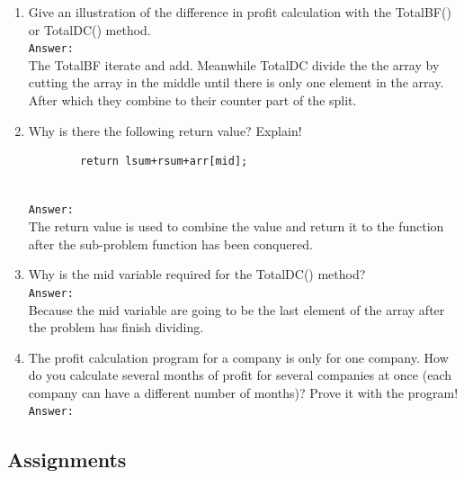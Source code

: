\documentclass[12pt,titlepage]{article}
\begin{document}
\begin{enumerate}
    \item Give an illustration of the difference in profit calculation with the TotalBF() or TotalDC() method.
    \mbox{}\\
    \texttt{Answer:}
    \mbox{}\\
    The TotalBF iterate and add. Meanwhile TotalDC divide the the array by cutting the array in the middle until there is only one element in the array. After which they combine to their counter part of the split.
    \item Why is there the following return value? Explain!
    \begin{verbatim}
        return lsum+rsum+arr[mid];
    \end{verbatim}
    \mbox{}\\
    \texttt{Answer:}
    \mbox{}\\
    The return value is used to combine the value and return it to the function after the sub-problem function has been conquered.
    \item Why is the mid variable required for the TotalDC() method?
    \mbox{}\\
    \texttt{Answer:}
    \mbox{}\\
    Because the mid variable are going to be the last element of the array after the problem has finish dividing.
    \item The profit calculation program for a company is only for one company. How do you calculate several months of profit for several companies at once (each company can have a different number of months)? Prove it with the program!
    \mbox{}\\
    \texttt{Answer:}
    \mbox{}\\
\end{enumerate}

\subsection{Assignments}
\end{document}

